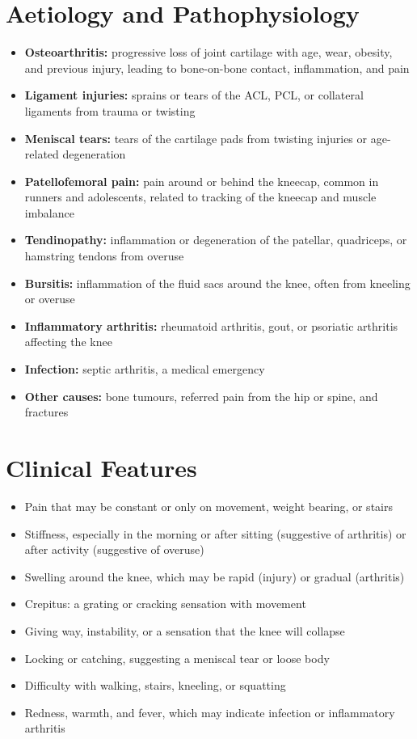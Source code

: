 \section*{Aetiology and Pathophysiology}
\begin{itemize}
    \item \textbf{Osteoarthritis:} progressive loss of joint cartilage with age, wear, obesity, and previous injury, leading to bone-on-bone contact, inflammation, and pain
    \item \textbf{Ligament injuries:} sprains or tears of the ACL, PCL, or collateral ligaments from trauma or twisting
    \item \textbf{Meniscal tears:} tears of the cartilage pads from twisting injuries or age-related degeneration
    \item \textbf{Patellofemoral pain:} pain around or behind the kneecap, common in runners and adolescents, related to tracking of the kneecap and muscle imbalance
    \item \textbf{Tendinopathy:} inflammation or degeneration of the patellar, quadriceps, or hamstring tendons from overuse
    \item \textbf{Bursitis:} inflammation of the fluid sacs around the knee, often from kneeling or overuse
    \item \textbf{Inflammatory arthritis:} rheumatoid arthritis, gout, or psoriatic arthritis affecting the knee
    \item \textbf{Infection:} septic arthritis, a medical emergency
    \item \textbf{Other causes:} bone tumours, referred pain from the hip or spine, and fractures
\end{itemize}

\section*{Clinical Features}
\begin{itemize}
    \item Pain that may be constant or only on movement, weight bearing, or stairs
    \item Stiffness, especially in the morning or after sitting (suggestive of arthritis) or after activity (suggestive of overuse)
    \item Swelling around the knee, which may be rapid (injury) or gradual (arthritis)
    \item Crepitus: a grating or cracking sensation with movement
    \item Giving way, instability, or a sensation that the knee will collapse
    \item Locking or catching, suggesting a meniscal tear or loose body
    \item Difficulty with walking, stairs, kneeling, or squatting
    \item Redness, warmth, and fever, which may indicate infection or inflammatory arthritis
\end{itemize}

